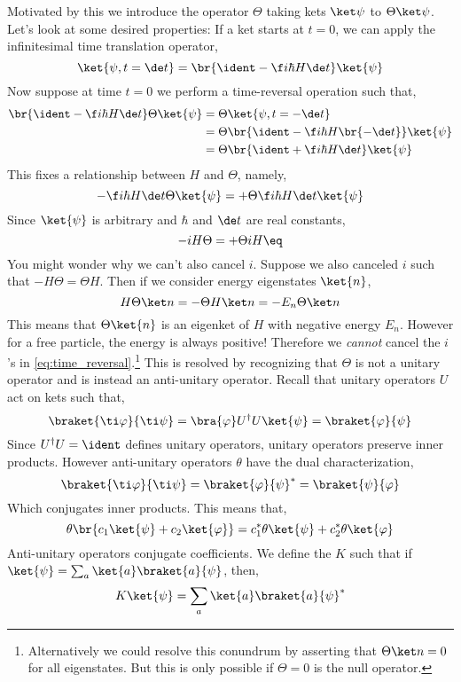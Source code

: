 \documentclass{article}
\begin{document}
Motivated by this we introduce the  operator $\Theta$ taking kets $\ket \psi$ to $\Theta \ket \psi$. Let's look at some desired properties: If a ket starts at $t = 0$, we can apply the infinitesimal time translation operator,
\[ \ket{\psi, t = \de t} = \br{\ident - \f i \hbar H \de t} \ket{\psi} \]
Now suppose at time $t = 0$ we perform a time-reversal operation such that,
\begin{align*}
\br{\ident - \f i \hbar H \de t} \Theta \ket{\psi}
&= \Theta \ket{\psi, t = - \de t} \\
&= \Theta \br{\ident - \f i \hbar H \br{-\de t}} \ket{\psi} \\
&= \Theta \br{\ident + \f i \hbar H \de t} \ket{\psi}
\end{align*}
This fixes a relationship between $H$ and $\Theta$, namely,
\[ -\f i \hbar H \de t \Theta \ket{\psi} = + \Theta \f i \hbar H \de t  \ket{\psi} \]
Since $\ket{\psi}$ is arbitrary and $\hbar$ and $\de t$ are real constants,
\[ -iH \Theta = + \Theta iH  \eq \label{eq:time_reversal}\]
You might wonder why we can't also cancel $i$. Suppose we also canceled $i$ such that $-H \Theta = \Theta H$. Then if we consider energy eigenstates $\ket{n}$,
\[ H \Theta \ket n = - \Theta H \ket n = - E_n \Theta \ket n \]
This means that $\Theta \ket{n}$ is an eigenket of $H$ with negative energy $E_n$. However for a free particle, the energy is always positive! Therefore we \textit{cannot} cancel the $i$'s in \cref{eq:time_reversal}.\footnote{Alternatively we could resolve this conundrum by asserting that $\Theta \ket n = 0$ for all eigenstates. But this is only possible if $\Theta = 0$ is the null operator.} This is resolved by recognizing that $\Theta$ is not a unitary operator and is instead an anti-unitary operator. Recall that unitary operators $U$ act on kets such that,
\[ \braket{\ti \varphi}{\ti \psi} = \bra{\varphi}U^{\dagger} U\ket{\psi} = \braket{\varphi}{\psi} \]
Since $U^{\dagger}U = \ident$ defines unitary operators, unitary operators preserve inner products. However anti-unitary operators $\theta$ have the dual characterization,
\[ \braket{\ti \varphi}{\ti \psi} = \braket{\varphi}{\psi}^* = \braket{\psi}{\varphi} \]
Which conjugates inner products. This means that,
\[ \theta \br{c_1  \ket{\psi} + c_2 \ket{\varphi}} = c_1^* \theta \ket{\psi} + c_2^* \theta \ket{\varphi} \]
Anti-unitary operators conjugate coefficients. We define the  $K$ such that if $\ket{\psi} = \sum_a \ket{a}\braket{a}{\psi}$, then,
\[ K \ket{\psi} = \sum_{a} \ket{a} \braket{a}{\psi}^* \]
\end{document}
